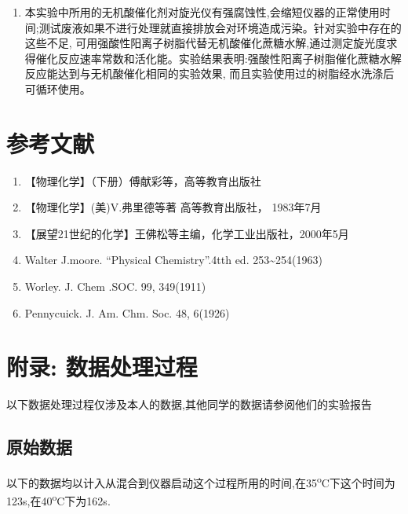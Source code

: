 \documentclass[11pt]{report}
\begin{document}
\begin{enumerate}
\begin{enumerate}
\[
	\ce{S + H^+ <=>T[快] SH^+}\quad \ce{SH^+ ->T[慢] x^+ } \quad \ce{x^+ + H2O ->T[快] P + H^+ }
	\]
另一个为
\[
	\ce{S + H^+ <=>T[快] SH^+}\quad \ce{SH^+ + H2O ->T[慢]  P + H^+ }
	\]
按照第一种机理属一级反应，从理论上可以推出反应速度常数\(k\) 应与\(h_{0}\) 成正比,按照第二种机理反应属假单分子（二级）反应，从理论上可以推出反应速度常数\(k\) 应与\([H^{+}]\) 成正比。从而实践证明第一种机理是正确的，因而蔗糖水解判为一级反应。
反应是一复杂反应。显然其计量方程式并不表示此反应的机理，反应也非双分子反应。
\item 本实验中所用的无机酸催化剂对旋光仪有强腐蚀性,会缩短仪器的正常使用时间;测试废液如果不进行处理就直接排放会对环境造成污染。针对实验中存在的这些不足, 可用强酸性阳离子树脂代替无机酸催化蔗糖水解,通过测定旋光度求得催化反应速率常数和活化能。实验结果表明:强酸性阳离子树脂催化蔗糖水解反应能达到与无机酸催化相同的实验效果,
而且实验使用过的树脂经水洗涤后可循环使用。
\end{enumerate}
\end{enumerate}
\part{参考文献}
\label{sec:org259d42b}
\begin{enumerate}
\item 【物理化学】（下册）傅献彩等，高等教育出版社
\item 【物理化学】(美)V.弗里德等著 高等教育出版社， 1983年7月
\item 【展望21世纪的化学】王佛松等主编，化学工业出版社，2000年5月
\item Walter J.moore. “Physical Chemistry”.4tth ed. 253\textasciitilde{}254(1963)
\item Worley. J. Chem .SOC. 99, 349(1911)
\item Pennycuick. J. Am. Chm. Soc. 48, 6(1926)
\end{enumerate}

\part{附录: 数据处理过程}
\label{sec:orgc8871bc}
以下数据处理过程仅涉及本人的数据,其他同学的数据请参阅他们的实验报告
\chapter{原始数据}
\label{sec:org60aa4be}
以下的数据均以计入从混合到仪器启动这个过程所用的时间,在35\textsuperscript{o}C下这个时间为123s,在40\textsuperscript{o}C下为162s.
\end{document}
